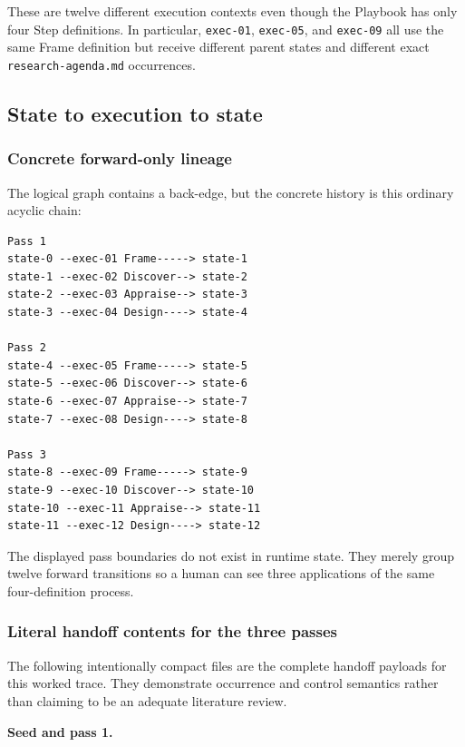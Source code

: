 \documentclass[11pt]{article}
\newcommand{\artifact}[1]{\texttt{#1}}
\begin{document}
These are twelve different execution contexts even though the Playbook has
only four Step definitions. In particular, \texttt{exec-01},
\texttt{exec-05}, and \texttt{exec-09} all use the same Frame definition but
receive different parent states and different exact
\artifact{research-agenda.md} occurrences.

\subsection{State to execution to state}

\subsubsection{Concrete forward-only lineage}

The logical graph contains a back-edge, but the concrete history is this
ordinary acyclic chain:

\begin{lstlisting}[style=playbook]
Pass 1
state-0 --exec-01 Frame-----> state-1
state-1 --exec-02 Discover--> state-2
state-2 --exec-03 Appraise--> state-3
state-3 --exec-04 Design----> state-4

Pass 2
state-4 --exec-05 Frame-----> state-5
state-5 --exec-06 Discover--> state-6
state-6 --exec-07 Appraise--> state-7
state-7 --exec-08 Design----> state-8

Pass 3
state-8 --exec-09 Frame-----> state-9
state-9 --exec-10 Discover--> state-10
state-10 --exec-11 Appraise--> state-11
state-11 --exec-12 Design----> state-12
\end{lstlisting}

The displayed pass boundaries do not exist in runtime state. They merely group
twelve forward transitions so a human can see three applications of the same
four-definition process.

\subsubsection{Literal handoff contents for the three passes}

The following intentionally compact files are the complete handoff payloads for
this worked trace. They demonstrate occurrence and control semantics rather
than claiming to be an adequate literature review.

\medskip
\noindent\textbf{Seed and pass 1.}\par\smallskip
\end{document}
